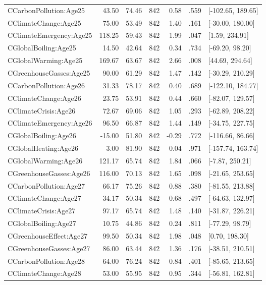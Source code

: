 \begin{table}[ht]
\begin{tabular}{lrrrrrl}
  CCarbonPollution:Age25 & 43.50 & 74.46 & 842 & 0.58 & .559 & [-102.65, 189.65] \\ 
  CClimateChange:Age25 & 75.00 & 53.49 & 842 & 1.40 & .161 & [-30.00, 180.00] \\ 
  CClimateEmergency:Age25 & 118.25 & 59.43 & 842 & 1.99 & .047 & [1.59, 234.91] \\ 
  CGlobalBoiling:Age25 & 14.50 & 42.64 & 842 & 0.34 & .734 & [-69.20, 98.20] \\ 
  CGlobalWarming:Age25 & 169.67 & 63.67 & 842 & 2.66 & .008 & [44.69, 294.64] \\ 
  CGreenhouseGasses:Age25 & 90.00 & 61.29 & 842 & 1.47 & .142 & [-30.29, 210.29] \\ 
  CCarbonPollution:Age26 & 31.33 & 78.17 & 842 & 0.40 & .689 & [-122.10, 184.77] \\ 
  CClimateChange:Age26 & 23.75 & 53.91 & 842 & 0.44 & .660 & [-82.07, 129.57] \\ 
  CClimateCrisis:Age26 & 72.67 & 69.06 & 842 & 1.05 & .293 & [-62.89, 208.22] \\ 
  CClimateEmergency:Age26 & 96.50 & 66.87 & 842 & 1.44 & .149 & [-34.75, 227.75] \\ 
  CGlobalBoiling:Age26 & -15.00 & 51.80 & 842 & -0.29 & .772 & [-116.66, 86.66] \\ 
  CGlobalHeating:Age26 & 3.00 & 81.90 & 842 & 0.04 & .971 & [-157.74, 163.74] \\ 
  CGlobalWarming:Age26 & 121.17 & 65.74 & 842 & 1.84 & .066 & [-7.87, 250.21] \\ 
  CGreenhouseGasses:Age26 & 116.00 & 70.13 & 842 & 1.65 & .098 & [-21.65, 253.65] \\ 
  CCarbonPollution:Age27 & 66.17 & 75.26 & 842 & 0.88 & .380 & [-81.55, 213.88] \\ 
  CClimateChange:Age27 & 34.17 & 50.34 & 842 & 0.68 & .497 & [-64.63, 132.97] \\ 
  CClimateCrisis:Age27 & 97.17 & 65.74 & 842 & 1.48 & .140 & [-31.87, 226.21] \\ 
  CGlobalBoiling:Age27 & 10.75 & 44.86 & 842 & 0.24 & .811 & [-77.29, 98.79] \\ 
  CGreenhouseEffect:Age27 & 99.50 & 50.34 & 842 & 1.98 & .048 & [0.70, 198.30] \\ 
  CGreenhouseGasses:Age27 & 86.00 & 63.44 & 842 & 1.36 & .176 & [-38.51, 210.51] \\ 
  CCarbonPollution:Age28 & 64.00 & 76.24 & 842 & 0.84 & .401 & [-85.65, 213.65] \\ 
  CClimateChange:Age28 & 53.00 & 55.95 & 842 & 0.95 & .344 & [-56.81, 162.81] \\ 

\end{tabular}
\end{table}
